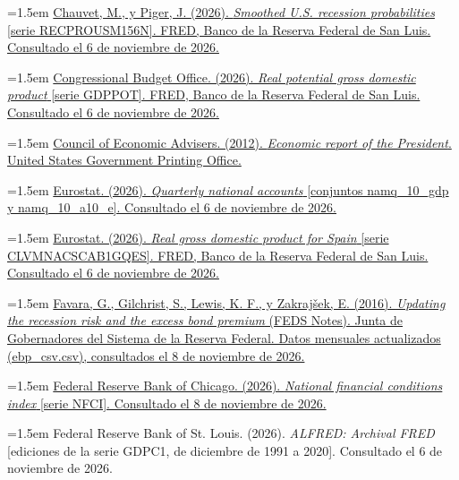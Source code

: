 \documentclass[10pt,a4paper]{article}
\begin{document}
\noindent\hangindent=1.5em \href{https://fred.stlouisfed.org/series/RECPROUSM156N}{Chauvet, M., y Piger, J. (2026). \textit{Smoothed U.S. recession probabilities} [serie RECPROUSM156N]. FRED, Banco de la Reserva Federal de San Luis. Consultado el 6 de noviembre de 2026.}

\noindent\hangindent=1.5em \href{https://fred.stlouisfed.org/series/GDPPOT}{Congressional Budget Office. (2026). \textit{Real potential gross domestic product} [serie GDPPOT]. FRED, Banco de la Reserva Federal de San Luis. Consultado el 6 de noviembre de 2026.}

\noindent\hangindent=1.5em \href{https://www.govinfo.gov/content/pkg/ERP-2012/html/ERP-2012-chapter1.htm}{Council of Economic Advisers. (2012). \textit{Economic report of the President}. United States Government Printing Office.}

\noindent\hangindent=1.5em \href{https://ec.europa.eu/eurostat/api/dissemination/statistics/1.0/data/namq_10_gdp}{Eurostat. (2026). \textit{Quarterly national accounts} [conjuntos namq\_10\_gdp y namq\_10\_a10\_e]. Consultado el 6 de noviembre de 2026.}

\noindent\hangindent=1.5em \href{https://fred.stlouisfed.org/series/CLVMNACSCAB1GQES}{Eurostat. (2026). \textit{Real gross domestic product for Spain} [serie CLVMNACSCAB1GQES]. FRED, Banco de la Reserva Federal de San Luis. Consultado el 6 de noviembre de 2026.}

{\sloppy\noindent\hangindent=1.5em \href{https://www.federalreserve.gov/econres/notes/feds-notes/updating-the-recession-risk-and-the-excess-bond-premium-20161006.html}{Favara, G., Gilchrist, S., Lewis, K. F., y Zakrajšek, E. (2016). \textit{Updating the recession risk and the excess bond premium} (FEDS Notes). Junta de Gobernadores del Sistema de la Reserva Federal. Datos mensuales actualizados (ebp\_csv.csv), consultados el 8 de noviembre de 2026.}\par}

\noindent\hangindent=1.5em \href{https://www.chicagofed.org/research/data/nfci/current-data}{Federal Reserve Bank of Chicago. (2026). \textit{National financial conditions index} [serie NFCI]. Consultado el 8 de noviembre de 2026.}

\noindent\hangindent=1.5em Federal Reserve Bank of St. Louis. (2026). \textit{ALFRED: Archival FRED} [ediciones de la serie GDPC1, de diciembre de 1991 a 2020]. Consultado el 6 de noviembre de 2026.
\end{document}
